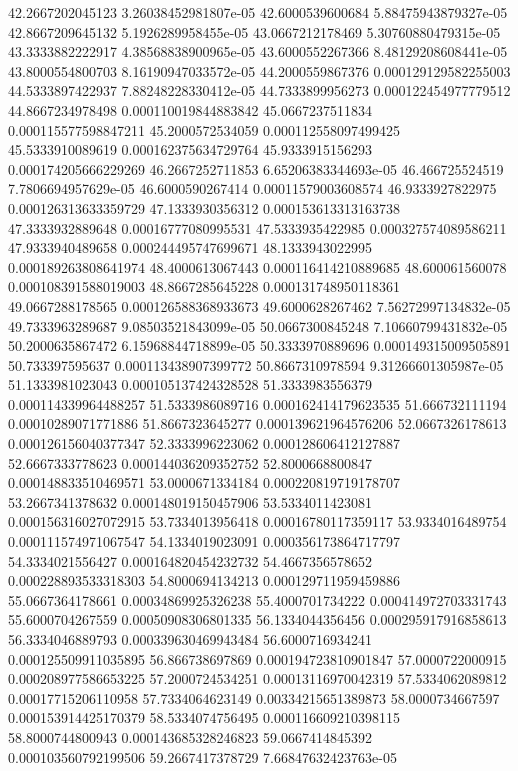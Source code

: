 {42.2667202045123 3.26038452981807e-05
42.6000539600684 5.88475943879327e-05
42.8667209645132 5.1926289958455e-05
43.0667212178469 5.30760880479315e-05
43.3333882222917 4.38568838900965e-05
43.6000552267366 8.48129208608441e-05
43.8000554800703 8.16190947033572e-05
44.2000559867376 0.000129129582255003
44.5333897422937 7.88248228330412e-05
44.7333899956273 0.000122454977779512
44.8667234978498 0.000110019844883842
45.0667237511834 0.000115577598847211
45.2000572534059 0.000112558097499425
45.5333910089619 0.000162375634729764
45.9333915156293 0.000174205666229269
46.2667252711853 6.65206383344693e-05
46.466725524519 7.7806694957629e-05
46.6000590267414 0.00011579003608574
46.9333927822975 0.000126313633359729
47.1333930356312 0.000153613313163738
47.3333932889648 0.00016777080995531
47.5333935422985 0.000327574089586211
47.9333940489658 0.000244495747699671
48.1333943022995 0.000189263808641974
48.4000613067443 0.000116414210889685
48.600061560078 0.000108391588019003
48.8667285645228 0.000131748950118361
49.0667288178565 0.000126588368933673
49.6000628267462 7.56272997134832e-05
49.7333963289687 9.08503521843099e-05
50.0667300845248 7.10660799431832e-05
50.2000635867472 6.15968844718899e-05
50.3333970889696 0.000149315009505891
50.733397595637 0.000113438907399772
50.8667310978594 9.31266601305987e-05
51.1333981023043 0.000105137424328528
51.3333983556379 0.000114339964488257
51.5333986089716 0.000162414179623535
51.666732111194 0.00010289071771886
51.8667323645277 0.000139621964576206
52.0667326178613 0.000126156040377347
52.3333996223062 0.000128606412127887
52.6667333778623 0.000144036209352752
52.8000668800847 0.000148833510469571
53.0000671334184 0.000220819719178707
53.2667341378632 0.000148019150457906
53.5334011423081 0.000156316027072915
53.7334013956418 0.00016780117359117
53.9334016489754 0.000111574971067547
54.1334019023091 0.000356173864717797
54.3334021556427 0.000164820454232732
54.4667356578652 0.000228893533318303
54.8000694134213 0.000129711959459886
55.0667364178661 0.00034869925326238
55.4000701734222 0.000414972703331743
55.6000704267559 0.00050908306801335
56.1334044356456 0.000295917916858613
56.3334046889793 0.000339630469943484
56.6000716934241 0.000125509911035895
56.866738697869 0.000194723810901847
57.0000722000915 0.000208977586653225
57.2000724534251 0.00013116970042319
57.5334062089812 0.00017715206110958
57.7334064623149 0.00334215651389873
58.0000734667597 0.000153914425170379
58.5334074756495 0.000116609210398115
58.8000744800943 0.000143685328246823
59.0667414845392 0.000103560792199506
59.2667417378729 7.66847632423763e-05
}
